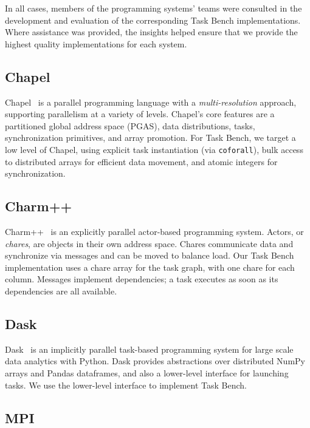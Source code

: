 In all cases, members of the programming systems' teams
were consulted in the development and evaluation of the
corresponding Task Bench implementations. Where assistance was provided, the insights helped ensure that we provide the highest quality implementations for each system.

\subsection{Chapel}

Chapel~\cite{Chapel15} is a parallel programming language
with a \emph{multi-res\-o\-lu\-tion} approach, supporting parallelism at a variety of
levels. Chapel's core features are a partitioned global address space
(PGAS), data distributions, tasks,
synchronization primitives, and array promotion. For Task Bench, we target a low level of
Chapel, using explicit task instantiation (via
\lstinline[language=Chapel]{coforall}), bulk access to distributed
arrays for efficient data movement, and atomic integers for
synchronization.

\subsection{Charm++}

Charm++~\cite{Charmpp93} is an explicitly parallel actor-based programming system. Actors, or
\emph{chares}, are objects in their own address space.
Chares communicate data and synchronize via messages and can be moved
to balance load. Our Task Bench implementation uses a chare
array for the task graph, with one chare for each column. Messages implement dependencies; a task executes as soon as its
dependencies are all available.



\subsection{Dask}

Dask~\cite{Dask15} is an implicitly parallel task-based programming system for large
scale data analytics with Python. Dask provides abstractions over
distributed NumPy arrays and Pandas dataframes, and also a lower-level
interface for launching tasks. We use the lower-level interface to
implement Task Bench.

\subsection{MPI}

